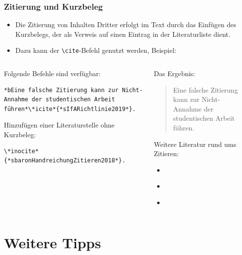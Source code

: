 \documentclass[german,notoc]{tudbeamer}%
\begin{document}
\begin{frame}[fragile]\frametitle{Zitierung und Kurzbeleg}
    \begin{itemize}
    	\item Die Zitierung von Inhalten Dritter erfolgt im Text durch das Einfügen des Kurzbelegs, der als Verweis auf einen Eintrag in der Literaturliste dient.
    	\item Dazu kann der \texttt{\textbackslash cite}-Befehl genutzt werden, Beispiel:
    \end{itemize}		
    \begin{columns}[T,onlytextwidth]
		\begin{column}{.39\textwidth}	
			Folgende Befehle sind verfügbar:
			\begin{lstlisting}[gobble=8,style=latex,breakindent=0pt]
				*bEine falsche Zitierung kann zur Nicht-Annahme der studentischen Arbeit führen*\*icite*{*sIfARichtlinie2019*}.
			\end{lstlisting}
			Hinzufügen einer Literaturstelle ohne Kurzbeleg:

			\begin{lstlisting}[gobble=8,style=latex,breakindent=0pt]
				\*inocite*{*sbaronHandreichungZitieren2018*}.
			\end{lstlisting}
		\end{column}
		\begin{column}{.5\textwidth}	
			Das Ergebnis:\\
			\begin{quote}Eine falsche Zitierung kann zur Nicht-Annahme der studentischen Arbeit führen\cite{IfARichtlinie2019}.\end{quote}

			Weitere Literatur rund ums Zitieren:\\
			\begin{itemize}
				\item {}\cite{baronHandreichungZitieren2018}
				\item {}\cite{SLUBZitierenHandreichung2018}
				\item {}\cite{SchwenkeBildzitate2012}
			\end{itemize}
		\end{column}
	\end{columns}
\end{frame}

\section{Weitere Tipps}
\end{document}
